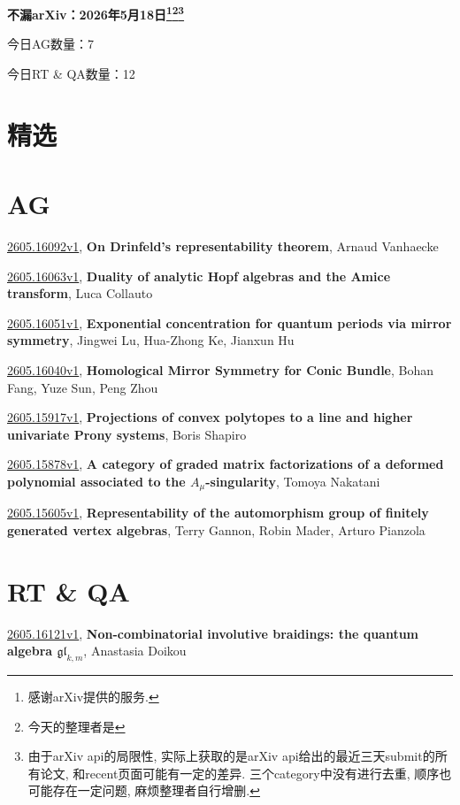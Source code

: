 \documentclass[9pt, a4paper]{article}
\theoremstyle{plain}
\theoremstyle{definition}
\theoremstyle{remark}
\newcommand{\arxiv}[3]{\href{https://arxiv.org/abs/#1}{#1}, \textbf{\textcolor{arxivblue}{#2}}, #3}
\newcommand{\AGnumber}{7}
\newcommand{\RTQAnumber}{12}
\newcommand{\NewestDate}{2026年5月18日}
\newcommand{\todayarXiver}{} %
\begin{document}
\begin{center}
    \Huge\textbf{不漏arXiv：\NewestDate\footnote{感谢arXiv提供的服务.}\footnote{今天的整理者是\todayarXiver}\footnote{由于arXiv api的局限性, 实际上获取的是arXiv api给出的最近三天submit的所有论文, 和recent页面可能有一定的差异. 三个category中没有进行去重, 顺序也可能存在一定问题, 麻烦整理者自行增删.}} \\
\end{center}

\setcounter{section}{-1}

\begin{center}
    今日AG数量：\AGnumber
    
    今日RT \& QA数量：\RTQAnumber
    
\end{center}


\section{精选}


\section{AG}
\arxiv{2605.16092v1}{On Drinfeld's representability theorem}{Arnaud Vanhaecke}

\arxiv{2605.16063v1}{Duality of analytic Hopf algebras and the Amice transform}{Luca Collauto}

\arxiv{2605.16051v1}{Exponential concentration for quantum periods via mirror symmetry}{Jingwei Lu, Hua-Zhong Ke, Jianxun Hu}

\arxiv{2605.16040v1}{Homological Mirror Symmetry for Conic Bundle}{Bohan Fang, Yuze Sun, Peng Zhou}

\arxiv{2605.15917v1}{Projections of convex polytopes to a line and higher univariate Prony systems}{Boris Shapiro}

\arxiv{2605.15878v1}{A category of graded matrix factorizations of a deformed polynomial associated to the $A_μ$-singularity}{Tomoya Nakatani}

\arxiv{2605.15605v1}{Representability of the automorphism group of finitely generated vertex algebras}{Terry Gannon, Robin Mader, Arturo Pianzola}


\section{RT \& QA}
\arxiv{2605.16121v1}{Non-combinatorial involutive braidings: the quantum algebra $\mathfrak{gl}_{k,m}$}{Anastasia Doikou}
\end{document}

